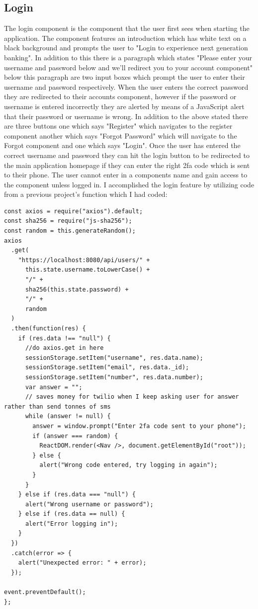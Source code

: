 \subsection{Login}
The login component is the component that the user first sees when starting the application.  The component features an introduction which has white text on a black background and prompts the user to "Login to experience next generation banking".  In addition to this there is a paragraph which states "Please enter your username and password below and we'll redirect you to your account component"  below this paragraph are two input boxes which prompt the user to enter their username and password respectively.  When the user enters the correct password they are redirected to their accounts component, however if the password or username is entered incorrectly they are alerted by means of a JavaScript alert that their password or username is wrong.  In addition to the above stated there are three buttons one which says "Register" which navigates to the register component another which says "Forgot Password" which will navigate to the Forgot component and one which says "Login".  Once the user has entered the correct username and password they can hit the login button to be redirected to the main application homepage if they can enter the right 2fa code which is sent to their phone.  The user cannot enter in a components name and gain access to the component unless logged in.  I accomplished the login feature by utilizing code from a previous project's function which I had coded:
\begin{verbatim}
const axios = require("axios").default;
const sha256 = require("js-sha256");
const random = this.generateRandom();
axios
  .get(
    "https://localhost:8080/api/users/" +
      this.state.username.toLowerCase() +
      "/" +
      sha256(this.state.password) +
      "/" +
      random
  )
  .then(function(res) {
    if (res.data !== "null") {
      //do axios.get in here
      sessionStorage.setItem("username", res.data.name);
      sessionStorage.setItem("email", res.data._id);
      sessionStorage.setItem("number", res.data.number);
      var answer = "";
      // saves money for twilio when I keep asking user for answer rather than send tonnes of sms
      while (answer != null) {
        answer = window.prompt("Enter 2fa code sent to your phone");
        if (answer === random) {
          ReactDOM.render(<Nav />, document.getElementById("root"));
        } else {
          alert("Wrong code entered, try logging in again");
        }
      }
    } else if (res.data === "null") {
      alert("Wrong username or password");
    } else if (res.data == null) {
      alert("Error logging in");
    }
  })
  .catch(error => {
    alert("Unexpected error: " + error);
  });

event.preventDefault();
};
\end{verbatim}
